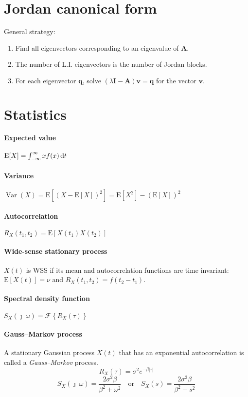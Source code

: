 \documentclass[a4paper]{article}
\newcommand{\M}[1]{\bm{#1}}
\newcommand{\Mc}[1]{\mathbf{#1}}
\newcommand{\V}[1]{\mathbf{#1}}
\newcommand{\E}{\text{E}}
\newcommand{\fourier}{\mathcal{F}}
\DeclareMathOperator{\Var}{Var}
\begin{document}
\section{Jordan canonical form}
General strategy:
\begin{enumerate}
\item Find all eigenvectors corresponding to an eigenvalue of $\M{A}$.
\item The number of L.I. eigenvectors is the number of Jordan blocks.
\item For each eigenvector $\V{q}$, solve $(\lambda \Mc{I} - \M{A}) \V{v} = \V{q}$ for the vector $\V{v}$.
\end{enumerate}



\section{Statistics}
\paragraph{Expected value} $\E[X] = \int_{-\infty}^{\infty} x f(x) \dif t$
\paragraph{Variance} $\Var(X) = \E[(X-\E[X])^{2}] = \E[X^{2}] - (\E[X])^{2}$
\paragraph{Autocorrelation} $R_X(t_1, t_2) = \E[X(t_1)X(t_2)]$
\paragraph{Wide-sense stationary process} $X(t)$ is WSS if its mean and autocorrelation functions are time invariant: \quad  $\E[X(t)] = \nu$ \quad and \quad $R_X(t_1, t_2) = f(t_2-t_1)$.
\paragraph{Spectral density function} $S_X(\jmath\:\omega) = \fourier\left\{ R_X(\tau) \right\}$
\paragraph{Gauss--Markov process} A stationary Gaussian process $X(t)$ that has an exponential autocorrelation is called a \emph{Gauss--Markov} process.
$$R_X(\tau) = \sigma^2 e^{-\beta |\tau|}$$ $$S_X(\jmath\:\omega) = \frac{2\sigma^2\beta}{\beta^2 + \omega^2} \quad\text{or}\quad S_X(s) = \frac{2\sigma^2\beta}{\beta^2 - s^2}$$
\end{document}
